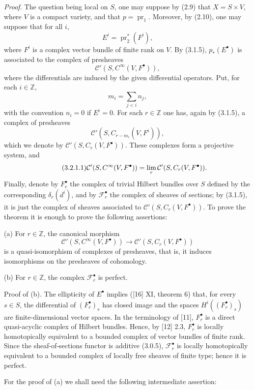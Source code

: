 \documentclass[11pt]{article}
\begin{document}
\emph{Proof.} The question being local on $S$, one may suppose by (2.9) that $X=S\times V$, where $V$ is a compact variety, and that $p=\operatorname{pr}_1$. Moreover, by (2.10), one may suppose that for all $i$,
\[
 E^i=\operatorname{pr}_2^*(F^i),
\]
where $F^i$ is a complex vector bundle of finite rank on $V$. By (3.1.5), $p_*(E^\bullet)$ is associated to the complex of presheaves
\[
 \mathcal C'(S,C^\infty(V,F^\bullet)),
\]
where the differentials are induced by the given differential operators. Put, for each $i\in\mathbb Z$,
\[
 m_i=\sum_{j<i}n_j,
\]
with the convention $n_i=0$ if $E^i=0$. For each $r\in\mathbb Z$ one has, again by (3.1.5), a complex of presheaves
\[
 \mathcal C'(S,C_{r-m_i}(V,F^i)),
\]
which we denote by $\mathcal C'(S,C_r(V,F^\bullet))$. These complexes form a projective system, and
\begin{equation}\tag{3.2.1.1}
 \mathcal C'(S,C^\infty(V,F^\bullet))
 =\operatorname*{lim}_r \mathcal C'(S,C_r(V,F^\bullet)).
\end{equation}
Finally, denote by $F_r^\bullet$ the complex of trivial Hilbert bundles over $S$ defined by the corresponding $\delta_r(d^i)$, and by $\mathcal F_r^\bullet$ the complex of sheaves of sections; by (3.1.5), it is just the complex of sheaves associated to $\mathcal C'(S,C_r(V,F^\bullet))$. To prove the theorem it is enough to prove the following assertions:

(a) For $r\in\mathbb Z$, the canonical morphism
\[
 \mathcal C'(S,C^\infty(V,F^\bullet))\longrightarrow \mathcal C'(S,C_r(V,F^\bullet))
\]
is a quasi-isomorphism of complexes of presheaves, that is, it induces isomorphisms on the presheaves of cohomology.

(b) For $r\in\mathbb Z$, the complex $\mathcal F_r^\bullet$ is perfect.

Proof of (b). The ellipticity of $E^\bullet$ implies ([16] XI, theorem 6) that, for every $s\in S$, the differential of $(F_r^\bullet)_s$ has closed image and the spaces $H^i((F_r^\bullet)_s)$ are finite-dimensional vector spaces. In the terminology of [11], $F_r^\bullet$ is a direct quasi-acyclic complex of Hilbert bundles. Hence, by [12] 2.3, $F_r^\bullet$ is locally homotopically equivalent to a bounded complex of vector bundles of finite rank. Since the sheaf-of-sections functor is additive (3.0.5), $\mathcal F_r^\bullet$ is locally homotopically equivalent to a bounded complex of locally free sheaves of finite type; hence it is perfect.

For the proof of (a) we shall need the following intermediate assertion:
\end{document}
